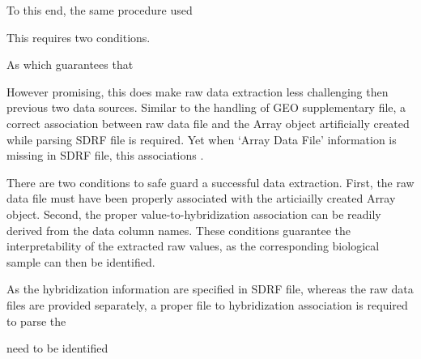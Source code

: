 To this end, the same procedure used


This requires two conditions.



As which guarantees that
%


However promising, this does make raw data extraction less challenging
then previous two data sources. 
%
Similar to the handling of GEO supplementary file, a correct association
between raw data file and the Array object artificially created while
parsing SDRF file is required.
%
Yet when `Array Data File' information is missing in SDRF file, this
associations .

There are two conditions to safe guard a successful data extraction.
%
First, the raw data file must have been properly associated with the
articiailly created Array object.
%
Second, the proper value-to-hybridization association can be readily
derived from the data column names.
%
These conditions guarantee the interpretability of the extracted raw
values, as the corresponding biological sample can then be identified.
%

As the hybridization information are specified in SDRF file, whereas the raw
data files are provided separately, a proper file to hybridization
association is required to parse the

need to be identified





%
% 


%
%
%
%
%

%
%
%
%

